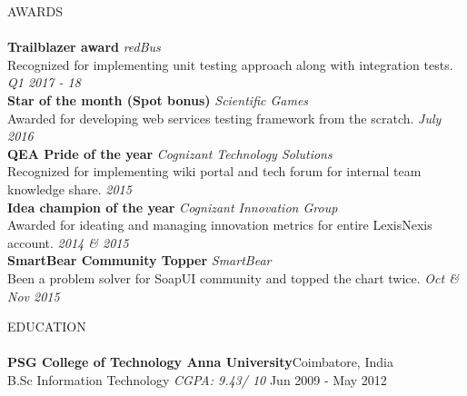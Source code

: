 \documentclass[a4paper]{article}
\newcommand{\lineunder} {
    \vspace*{-8pt} \\
    \hspace*{-18pt} \hrulefill \\
}
\newcommand{\header} [1] {
    {\hspace*{-18pt}\vspace*{6pt} \textsc{#1}}
    \vspace*{-6pt} \lineunder
}
\begin{document}
\header{AWARDS}
\textbf{Trailblazer award} \hfill \textit{redBus}\\
Recognized for implementing unit testing approach along with integration tests. \hfill \textit{Q1 2017 - 18}\\
\vspace*{0.5mm}
\textbf{Star of the month (Spot bonus)} \hfill \textit{Scientific Games}\\
Awarded for developing web services testing framework from the scratch. \hfill \textit{July 2016}\\
\vspace*{0.5mm}
\textbf{QEA Pride of the year} \hfill \textit{Cognizant Technology Solutions}\\
Recognized for implementing wiki portal and tech forum for internal team knowledge share. \hfill \textit{2015}\\
\vspace*{0.5mm}
\textbf{Idea champion of the year} \hfill \textit{Cognizant Innovation Group}\\
Awarded for ideating and managing innovation metrics for entire LexisNexis account. \hfill \textit{2014 \& 2015}\\
\vspace*{0.5mm}
\textbf{SmartBear Community Topper} \hfill \textit{SmartBear}\\
Been a problem solver for SoapUI community and topped the chart twice. \hfill \textit{Oct \& Nov 2015}\\
\vspace*{0.5mm}

\header{EDUCATION}
\textbf{PSG College of Technology \textbar{} Anna University}\hfill Coimbatore, India\\
B.Sc Information Technology \textit{CGPA: 9.43/ 10} \hfill Jun 2009 - May 2012\\
\vspace*{-12pt}
\end{document}
